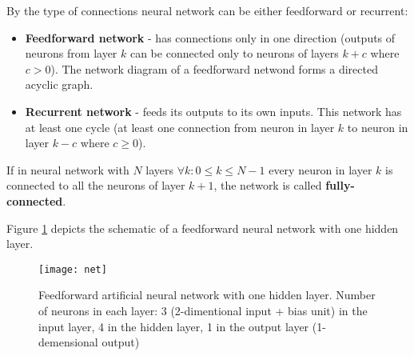 By the type of connections neural network can be either feedforward or recurrent:
\begin{itemize}
  \item \textbf{Feedforward network} - has connections only in one direction (outputs of neurons from layer $ k $ can be connected only to neurons of layers $ k + c $ where $ c > 0 $). The network diagram of a feedforward netwond forms a directed acyclic graph.
  \item \textbf{Recurrent network} - feeds its outputs to its own inputs. This network has at least one cycle (at least one connection from neuron in layer $ k $ to neuron in layer $ k - c $ where $ c \geq 0 $). 
\end{itemize}
  
If in neural network with $ N $ layers $ \forall k:0 \leq k \leq N-1  $ every neuron in layer $ k $ is connected to all the neurons of layer $ k+1 $, the network is called \textbf{fully-connected}.
  
Figure \ref{fig:net} depicts the schematic of a feedforward neural network with one hidden layer.
  
\begin{figure}[H]
  \centering
  \texttt{[image: net]}
  \caption{Feedforward artificial neural network with one hidden layer. Number of neurons in each layer: 3 (2-dimentional input + bias unit) in the input layer, 4 in the hidden layer, 1 in the output layer (1-demensional output)}
  \label{fig:net}
\end{figure}
